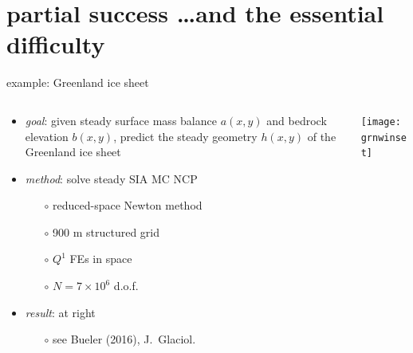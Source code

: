 \documentclass[xcolor={dvipsnames}]{beamer}
\begin{document}
\section{partial success \dots and the essential difficulty}

\begin{frame}{example: Greenland ice sheet}

\begin{columns}
\begin{column}{0.6\textwidth}
\begin{itemize}
\item \emph{goal}: given steady surface mass balance $a(x,y)$ and bedrock elevation $b(x,y)$, predict the steady geometry $h(x,y)$ of the Greenland ice sheet

\bigskip
\item \emph{method}: solve steady SIA MC NCP
  \begin{itemize}
  \item[$\circ$] reduced-space Newton method
  \item[$\circ$] 900 m structured grid
  \item[$\circ$] $Q^1$ FEs in space
  \item[$\circ$] $N=7\times 10^6$ d.o.f.
  \end{itemize}
\item \emph{result}: at right
  \begin{itemize}
  \item[$\circ$] see Bueler (2016), J.~Glaciol.
  \end{itemize}
\end{itemize}
\end{column}
\begin{column}{0.4\textwidth}
\vspace{-5mm}

\begin{center}
\texttt{[image: grnwinset]}
\end{center}
\end{column}
\end{columns}
\end{frame}
\end{document}
